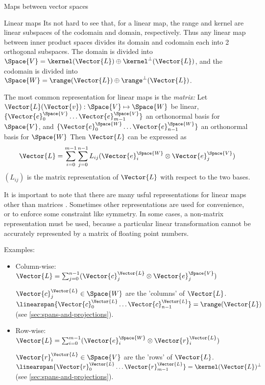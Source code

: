 \begin{plSection}{Maps between vector spaces}
\begin{plSection}{Linear maps}
Its not hard to see that, for a linear map,
the range and kernel are linear subspaces of the codomain and
domain, respectively.
Thus any linear map between inner product spaces
divides its domain and codomain each into 2 orthogonal subspaces.
The domain is divided into $\Space{V} = \kernel(\Vector{L}) \oplus \kernel^{\perp}(\Vector{L})$,
and the codomain is divided into $\Space{W} = \range(\Vector{L}) \oplus \range^{\perp}(\Vector{L})$.

The most common representation for linear maps is the {\it matrix:}
Let $\Vector{L}(\Vector{v}):\Space{V} \mapsto \Space{W}$ be linear,
$\{ \Vector{e}_0^{\Space{V}} \ldots  \Vector{e}_{m-1}^{\Space{V}} \}$ an orthonormal basis for $\Space{V}$,
and
$\{ \Vector{e}_0^{\Space{W}} \ldots \Vector{e}_{n-1}^{\Space{W}} \}$ an orthonormal  basis for $\Space{W}$
Then $\Vector{L}$ can be expressed as
\begin{equation}
\Vector{L}
 =
\sum_{i=0}^{m-1} \sum_{j=0}^{n-1} L_{ij} ( \Vector{e}_i^{\Space{W}} \otimes \Vector{e}_j^{\Space{V}} )
\end{equation}
$(L_{ij})$ is the matrix representation of $\Vector{L}$ with respect to
the two bases\cite{Halmos:1958:Finite}.

It is important to note that there are many usful
representations for linear maps other than matrices \cite{McDonald:1989:OOPSLA}.
Sometimes other representations are used for convenience,
or to enforce some constraint like symmetry.
In some cases, a non-matrix representation must be used,
because a particular linear transformation
cannot be accurately represented by a matrix of floating point numbers.

Examples:

\begin{itemize}

\item Column-wise:
$\Vector{L} = 
\sum_{j=0}^{n-1} ( \Vector{c}_j^{\Vector{L}} 
\otimes \Vector{e}_j^{\Space{V}} )$

$\Vector{c}_j^{\Vector{L}} \in \Space{W}$ 
are the 'columns' of $\Vector{L}$.
$\linearspan\{ \Vector{c}_0^{\Vector{L}} 
\ldots \Vector{c}_{n-1}^{\Vector{L}} \} 
= \range(\Vector{L})$
(see \cref{sec:spans-and-projections}).

\item Row-wise:
$\Vector{L} = \sum_{i=0}^{m-1} ( \Vector{e}_i^{\Space{W}} \otimes  \Vector{r}_i^{\Vector{L}} )$

$\Vector{r}_i^{\Vector{L}} \in \Space{V}$ are the 'rows' of $\Vector{L}$.
$\linearspan\{ \Vector{r}_0^{\Vector{L}} \ldots \Vector{r}_{m-1}^{\Vector{L}} \} =  \kernel(\Vector{L})^{\perp}$
(see \cref{sec:spans-and-projections}).


\end{itemize}
\end{plSection}
\end{plSection}
